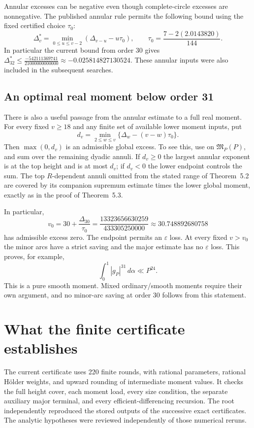 \documentclass[11pt,letterpaper]{article}
\theoremstyle{remark}
\newcommand{\M}{\mathfrak M}
\newcommand{\eps}{\varepsilon}
\newcommand{\dd}{\,d\alpha}
\newcommand{\CurrentDeltaThirtyTwoStar}{-0.025814827130524}
\newcommand{\CurrentDeltaThirtyTwoStarExact}{\frac{-542111369741}{21000000000000}}
\newcommand{\CurrentRealZero}{30.748892680758}
\newcommand{\CurrentRealZeroExact}{\frac{13323656630259}{433305250000}}
\newcommand{\CertificateRounds}{220}
\begin{document}
Annular excesses can be negative even though complete-circle excesses are
nonnegative. The published annular rule \cite[Section~5]{BW23} permits the following
bound using the fixed certified choice $\tau_0$:
\[
 \Delta_v^*=\min_{0\le u\le v-2}(\Delta_{v-u}-u\tau_0),\qquad
 \tau_0=\frac{7-2(2.0143820)}{144}.
\]
In particular the current bound from order 30 gives
$\Delta_{32}^*\le\CurrentDeltaThirtyTwoStarExact
\approx\CurrentDeltaThirtyTwoStar$.
These annular inputs were also included in the subsequent searches.

\subsection{An optimal real moment below order 31}

There is also a useful passage from the annular estimate to a full real moment.
For every fixed $v\ge18$ and any finite set of available lower moment inputs, put
\[
 d_v=\min_{2\le w\le v}\{\Delta_w-(v-w)\tau_0\}.
\]
Then $\max(0,d_v)$ is an admissible global excess. To see this, use
\cite[Theorem~1.3]{BW24} on $\M_P(P)$, and sum
\cite[Theorem~5.2]{BW23} over the remaining dyadic annuli. If $d_v\ge0$ the
largest annular exponent is at the top height and is at most $d_v$; if $d_v<0$
the lower endpoint controls the sum. The top $R$-dependent annuli omitted from
the stated range of Theorem~5.2 are covered by its companion supremum estimate
times the lower global moment, exactly as in the proof of Theorem~5.3.

In particular,
\[
 v_0=30+\frac{\Delta_{30}}{\tau_0}
       =\CurrentRealZeroExact\approx\CurrentRealZero
\]
has admissible excess zero. The endpoint permits an $\eps$ loss. At every fixed
$v>v_0$ the minor arcs have a strict saving and the major estimate has no
$\eps$ loss. This proves, for example,
\[
                     \boxed{\int_0^1|g_P|^{31}\dd\ll P^{24}.}
\]
This is a pure smooth moment. Mixed ordinary/smooth moments require their own
argument, and no minor-arc saving at order 30 follows from this statement.

\section{What the finite certificate establishes}

The current certificate uses \CertificateRounds{} finite rounds, with rational
parameters, rational H\"older weights, and upward rounding of intermediate moment
values. It checks the full height cover, each moment load, every size condition,
the separate auxiliary major terminal, and every efficient-differencing recursion.
The root independently reproduced the stored outputs of the successive exact
certificates. The analytic hypotheses were reviewed independently of those numerical
reruns.
\end{document}
